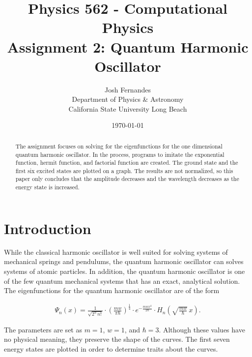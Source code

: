 \documentclass[12pt]{article}
\begin{document}




\title{Physics 562 - Computational Physics\\[.5cm]
Assignment 2: Quantum Harmonic Oscillator}
\author{Josh Fernandes\\
Department of Physics \& Astronomy\\
California State University Long Beach}
\date{\today}

  
\maketitle



\begin{abstract}
The assignment focuses on solving for the eigenfunctions for the one dimensional quantum harmonic oscillator. In the process, programs to imitate the exponential function, hermit function, and factorial function are created. The ground state and the first six excited states are plotted on a graph. The results are not normalized, so this paper only concludes that the amplitude decreases and the wavelength decreases as the energy state is increased.
\end{abstract}

\section{Introduction}\label{s:intro}

While the classical harmonic oscillator is well suited for solving systems of mechanical springs and pendulums, the quantum harmonic oscillator can solves systems of atomic particles. In addition, the quantum harmonic oscillator is one of the few quantum mechanical systems that has an exact, analytical solution. The eigenfunctions for the quantum harmonic oscillator are of the form

\begin{gather}
\Psi_n(x) = \frac{1}{\sqrt{2^n \, n!}}\cdot \left(\frac{mw}{\pi \hbar}\right)^{\frac{1}{4}} \cdot e^{-\frac{mwx^2}{2\hbar}} \cdot H_n \left(\sqrt{\frac{mw}{\hbar}} \, x \right).
\end{gather}

The parameters are set as $m=1$, $w=1$, and $\hbar=3$. Although these values have no physical meaning, they preserve the shape of the curves. The first seven energy states are plotted in order to determine traits about the curves.
\end{document}
